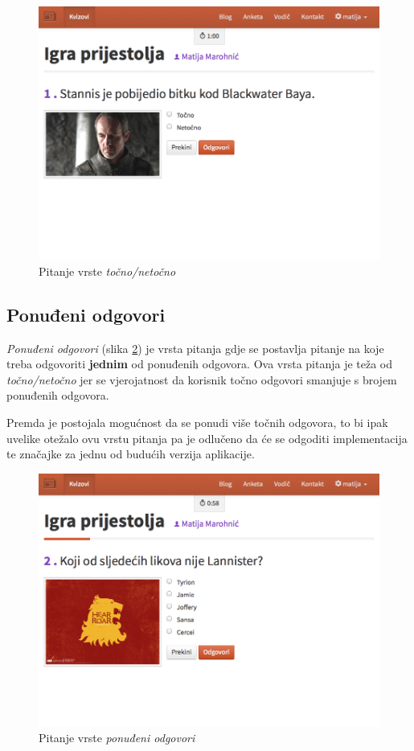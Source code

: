 \documentclass[11pt]{scrreprt}
\begin{document}
\begin{figure}[H]
  \includegraphics[width=\textwidth, clip=true, trim=0 7cm 0 0, fbox]{student/boolean_question}
  \caption{Pitanje vrste \emph{točno/netočno}}
  \label{fig:boolean}
\end{figure}

\subsection{Ponuđeni odgovori}

\emph{Ponuđeni odgovori} (slika \ref{fig:choice}) je vrsta pitanja gdje se
postavlja pitanje na koje treba odgovoriti \textbf{jednim} od ponuđenih
odgovora. Ova vrsta pitanja je teža od \emph{točno/netočno} jer se vjerojatnost
da korisnik točno odgovori smanjuje s brojem ponuđenih odgovora.

Premda je postojala mogućnost da se ponudi više točnih odgovora, to bi ipak
uvelike otežalo ovu vrstu pitanja pa je odlučeno da će se odgoditi
implementacija te značajke za jednu od budućih verzija aplikacije.

\begin{figure}[H]
  \includegraphics[width=\textwidth, clip=true, trim=0 5cm 0 0, fbox]{student/choice_question}
  \caption{Pitanje vrste \emph{ponuđeni odgovori}}
  \label{fig:choice}
\end{figure}
\end{document}
